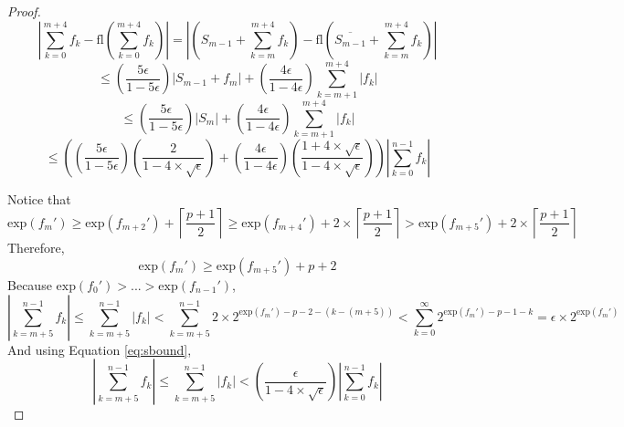 \documentclass[12pt]{article}
\providecommand{\ceil}[1]{\left \lceil #1 \right \rceil }
\providecommand{\exp}{\ensuremath{\text{exp}}}
\providecommand{\fl}{\ensuremath{\text{fl}}}
\theoremstyle{definition}
\numberwithin{equation}{section}
\begin{document}
\begin{proof}
      \begin{equation*}
        |\sum \limits_{k = 0}^{m + 4} f_k - \fl(\sum \limits_{k = 0}^{m + 4} f_k)| = |(S_{m - 1} + \sum \limits_{k = m}^{m + 4} f_k) - \fl(\overline{S_{m - 1}} + \sum \limits_{k = m}^{m + 4} f_k)|
      \end{equation*}
      \begin{equation*}
        \leq (\frac{5\epsilon}{1 - 5 \epsilon})|S_{m - 1} + f_m| + (\frac{4\epsilon}{1 - 4 \epsilon})\sum\limits_{k = m + 1}^{m + 4}|f_k|
      \end{equation*}
      \begin{equation*}
        \leq (\frac{5\epsilon}{1 - 5 \epsilon})|S_m| + (\frac{4\epsilon}{1 - 4 \epsilon})\sum\limits_{k = m + 1}^{m + 4}|f_k|
      \end{equation*}
      \begin{equation}
 \leq ((\frac{5\epsilon}{1 - 5 \epsilon})(\frac{2}{1 - 4 \times \sqrt\epsilon}) + (\frac{4\epsilon}{1 - 4 \epsilon})(\frac{1 + 4 \times \sqrt\epsilon}{1 - 4 \times \sqrt\epsilon}))|\sum\limits_{k = 0}^{n - 1}f_k|
        \label{eq:smfiveerror}
      \end{equation}

      Notice that
        \begin{equation*}
          \exp(f_m') \geq \exp(f_{m + 2}') + \ceil{\frac{p+ 1}{2}} \geq \exp(f_{m + 4}') + 2 \times \ceil{\frac{p+ 1}{2}} > \exp(f_{m + 5}')+ 2 \times \ceil{\frac{p+ 1}{2}}
        \end{equation*}
      Therefore,
        \begin{equation}
          \exp(f_m') \geq \exp(f_{m + 5}') + p + 2
          \label{eq:fmfiveexp}
        \end{equation}
      Because $\exp(f_0') > ... > \exp(f_{n - 1}')$,
        \begin{equation}
          |\sum\limits_{k = m + 5}^{n - 1} f_k| \leq \sum\limits_{k = m + 5}^{n - 1} |f_k| < \sum\limits_{k = m + 5}^{n - 1} 2 \times 2^{\exp(f_m') - p - 2 - (k - (m + 5))} < \sum\limits_{k = 0}^{\infty} 2^{\exp(f_m') - p - 1 - k} = \epsilon \times 2^{\exp(f_m')}
          \label{eq:boundfmfivesum}
        \end{equation}
      And using Equation \ref{eq:sbound},
        \begin{equation}
          |\sum\limits_{k = m + 5}^{n - 1} f_k| \leq \sum\limits_{k = m + 5}^{n - 1} |f_k| < (\frac{\epsilon}{1 - 4 \times \sqrt\epsilon})|\sum\limits_{k = 0}^{n - 1} f_k|
          \label{eq:relsboundfmfivesum}
        \end{equation}


\end{proof}
\end{document}
